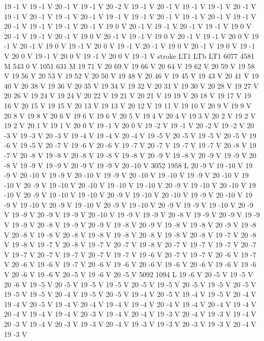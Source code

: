 {{{{{19 -1 V
19 -1 V
20 -1 V
19 -1 V
20 -2 V
19 -1 V
20 -1 V
19 -1 V
19 -1 V
20 -1 V
19 -1 V
20 -1 V
19 -1 V
20 -1 V
19 -1 V
19 -1 V
20 -1 V
19 -1 V
20 -1 V
19 -1 V
20 -1 V
19 -1 V
19 -1 V
20 -1 V
19 0 V
20 -1 V
19 -1 V
20 -1 V
19 -1 V
19 0 V
20 -1 V
19 -1 V
20 -1 V
19 0 V
20 -1 V
19 -1 V
19 0 V
20 -1 V
19 -1 V
20 0 V
19 -1 V
20 -1 V
19 0 V
19 -1 V
20 0 V
19 -1 V
20 -1 V
19 0 V
20 -1 V
19 0 V
19 -1 V
20 0 V
19 -1 V
20 0 V
19 -1 V
20 0 V
19 -1 V
stroke
LT1
LTb
LT1
6077 4581 M
543 0 V
1051 631 M
19 71 V
20 69 V
19 66 V
20 64 V
19 62 V
20 59 V
19 58 V
19 56 V
20 53 V
19 52 V
20 50 V
19 48 V
20 46 V
19 45 V
19 43 V
20 41 V
19 40 V
20 38 V
19 36 V
20 35 V
19 34 V
19 32 V
20 31 V
19 30 V
20 28 V
19 27 V
20 26 V
19 24 V
19 24 V
20 22 V
19 21 V
20 21 V
19 19 V
20 18 V
19 17 V
19 16 V
20 15 V
19 15 V
20 13 V
19 13 V
20 12 V
19 11 V
19 10 V
20 9 V
19 9 V
20 8 V
19 8 V
20 6 V
19 6 V
19 6 V
20 5 V
19 4 V
20 4 V
19 3 V
20 2 V
19 2 V
19 2 V
20 1 V
19 1 V
20 0 V
19 -1 V
20 0 V
19 -2 V
19 -1 V
20 -2 V
19 -2 V
20 -3 V
19 -3 V
20 -3 V
19 -4 V
19 -4 V
20 -4 V
19 -5 V
20 -5 V
19 -5 V
20 -5 V
19 -6 V
19 -5 V
20 -7 V
19 -6 V
20 -6 V
19 -7 V
20 -7 V
19 -7 V
19 -7 V
20 -8 V
19 -7 V
20 -8 V
19 -8 V
20 -8 V
19 -8 V
19 -8 V
20 -9 V
19 -8 V
20 -9 V
19 -9 V
20 -8 V
19 -9 V
19 -9 V
20 -9 V
19 -9 V
20 -10 V
3052 1958 L
20 -9 V
19 -10 V
19 -9 V
20 -10 V
19 -9 V
20 -10 V
19 -9 V
20 -10 V
19 -10 V
19 -9 V
20 -10 V
19 -10 V
20 -9 V
19 -10 V
20 -10 V
19 -10 V
19 -10 V
20 -9 V
19 -10 V
20 -10 V
19 -10 V
20 -9 V
19 -10 V
19 -10 V
20 -9 V
19 -10 V
20 -10 V
19 -9 V
20 -10 V
19 -9 V
19 -10 V
20 -9 V
19 -10 V
20 -9 V
19 -10 V
20 -9 V
19 -9 V
19 -10 V
20 -9 V
19 -9 V
20 -9 V
19 -9 V
20 -10 V
19 -9 V
19 -9 V
20 -8 V
19 -9 V
20 -9 V
19 -9 V
19 -9 V
20 -8 V
19 -9 V
20 -9 V
19 -8 V
20 -9 V
19 -8 V
19 -8 V
20 -9 V
19 -8 V
20 -8 V
19 -8 V
20 -8 V
19 -8 V
19 -8 V
20 -8 V
19 -8 V
20 -8 V
19 -7 V
20 -8 V
19 -8 V
19 -7 V
20 -8 V
19 -7 V
20 -7 V
19 -8 V
20 -7 V
19 -7 V
19 -7 V
20 -7 V
19 -7 V
20 -7 V
19 -7 V
20 -7 V
19 -7 V
19 -6 V
20 -7 V
19 -7 V
20 -6 V
19 -7 V
20 -6 V
19 -6 V
19 -7 V
20 -6 V
19 -6 V
20 -6 V
19 -6 V
20 -6 V
19 -6 V
19 -6 V
20 -6 V
19 -6 V
20 -5 V
19 -6 V
20 -5 V
5092 1094 L
19 -6 V
20 -5 V
19 -5 V
20 -6 V
19 -5 V
20 -5 V
19 -5 V
19 -5 V
20 -5 V
19 -5 V
20 -5 V
19 -5 V
20 -5 V
19 -5 V
19 -5 V
20 -4 V
19 -5 V
20 -5 V
19 -4 V
20 -5 V
19 -4 V
19 -5 V
20 -4 V
19 -4 V
20 -5 V
19 -4 V
20 -4 V
19 -4 V
19 -4 V
20 -4 V
19 -4 V
20 -4 V
19 -4 V
20 -4 V
19 -4 V
19 -4 V
20 -3 V
19 -4 V
20 -4 V
19 -3 V
20 -4 V
19 -3 V
19 -4 V
20 -3 V
19 -4 V
20 -3 V
19 -3 V
20 -4 V
19 -3 V
19 -3 V
20 -3 V
19 -3 V
20 -4 V
19 -3 V
}}}}}
